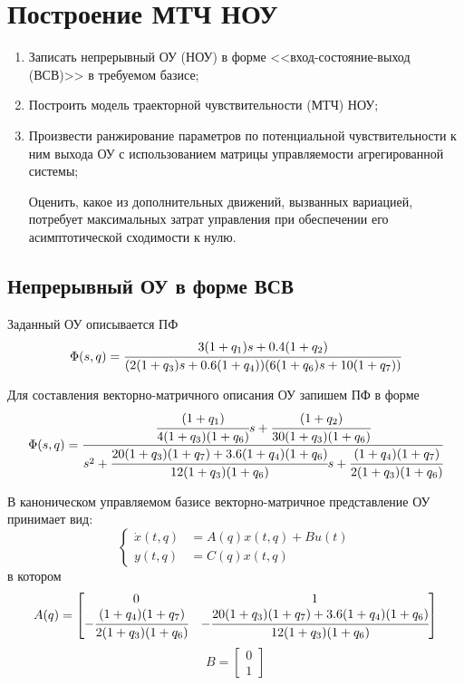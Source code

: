 \section{Построение МТЧ НОУ}\label{problem_1}

\begin{enumerate}
	\item Записать непрерывный ОУ (НОУ) в форме <<вход-состояние-выход (ВСВ)>> в требуемом базисе;
	\item Построить модель траекторной чувствительности (МТЧ) НОУ;
	\item Произвести ранжирование параметров  по потенциальной чувствительности к ним выхода ОУ с использованием матрицы управляемости агрегированной системы; 
	
	Оценить, какое из дополнительных движений, вызванных вариацией, потребует максимальных затрат управления при обеспечении его асимптотической сходимости к нулю.
\end{enumerate}


\subsection{Непрерывный ОУ в форме ВСВ}

Заданный ОУ описывается ПФ
\begin{equation}\label{eq_OU}
\Phi (s, q) = \cfrac{3 (1 + q_1) s + 0.4 (1 + q_2)}{(2 (1+q_3)s + 0.6 (1+q_4))(6 (1 + q_6) s + 10 (1 + q_7))}
\end{equation}

Для составления векторно-матричного описания ОУ запишем ПФ в форме
\begin{equation*}\label{eq_pf_coc}
\Phi (s, q) = \cfrac{\cfrac{(1 + q_1)}{4(1+q_3)(1+q_6)} s + \cfrac{(1 + q_2)}{30(1+q_3)(1+q_6)}}{s^2 + \cfrac{20(1+q_3)(1+q_7)+3.6(1+q_4)(1+q_6)}{12(1+q_3)(1+q_6)} s + \cfrac{(1+q_4)(1+q_7)}{2(1+q_3)(1+q_6)}}
\end{equation*}

В каноническом управляемом базисе векторно-матричное представление ОУ принимает вид:
\begin{equation}\label{eq_iso_coc}
\begin{cases}
\dot x(t,q) &= A(q) x(t,q) + B u(t)\\
y(t,q) &= C(q) x(t,q)
\end{cases}
\end{equation}
в котором
\begin{equation}
	A(q) =
	\begin{bmatrix}
		0 & 1 \\
		- \cfrac{(1+q_4)(1+q_7)}{2(1+q_3)(1+q_6)} & - \cfrac{20(1+q_3)(1+q_7)+3.6(1+q_4)(1+q_6)}{12(1+q_3)(1+q_6)}
	\end{bmatrix}
\end{equation}
\begin{equation}
	B =
	\begin{bmatrix}
		0\\
		1
	\end{bmatrix}
\end{equation}

